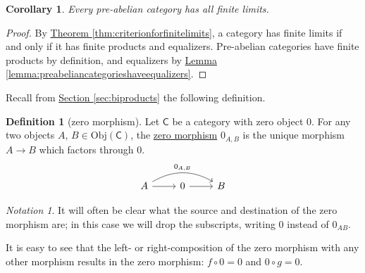 \documentclass[a4paper]{report}
\newcommand{\defn}[1]{\ul{#1}}
\newcommand{\Obj}{\mathrm{Obj}}
\theoremstyle{definition}
\newtheorem{definition}{Definition}[section]
\theoremstyle{plain}
\newtheorem{corollary}{Corollary}[section]
\theoremstyle{remark}
\newtheorem{notation}{Notation}[section]
\begin{document}
\begin{corollary}
  Every pre-abelian category has all finite limits.
\end{corollary}
\begin{proof}
  By \hyperref[thm:criterionforfinitelimits]{Theorem \ref*{thm:criterionforfinitelimits}}, a category has finite limits if and only if it has finite products and equalizers. Pre-abelian categories have finite products by definition, and equalizers by \hyperref[lemma:preabeliancategorieshaveequalizers]{Lemma \ref*{lemma:preabeliancategorieshaveequalizers}}.
\end{proof}

Recall from \hyperref[sec:biproducts]{Section \ref*{sec:biproducts}} the following definition.

\begin{definition}[zero morphism]
  \label{def:zeromorphism}
  Let $\mathsf{C}$ be a category with zero object $0$. For any two objects $A$, $B \in \Obj(\mathsf{C})$, the \defn{zero morphism} $0_{A,B}$ is the unique morphism $A \to B$ which factors through $0$.
  \begin{equation*}
    \begin{tikzcd}
      A
      \arrow[rr, bend left, "0_{A, B}"]
      \arrow[r]
      & 0
      \arrow[r]
      & B
    \end{tikzcd}
  \end{equation*}
\end{definition}

\begin{notation}
  It will often be clear what the source and destination of the zero morphism are; in this case we will drop the subscripts, writing $0$ instead of $0_{AB}$.
\end{notation}

It is easy to see that the left- or right-composition of the zero morphism with any other morphism results in the zero morphism: $f \circ 0 = 0$ and $0 \circ g = 0$.
\end{document}
